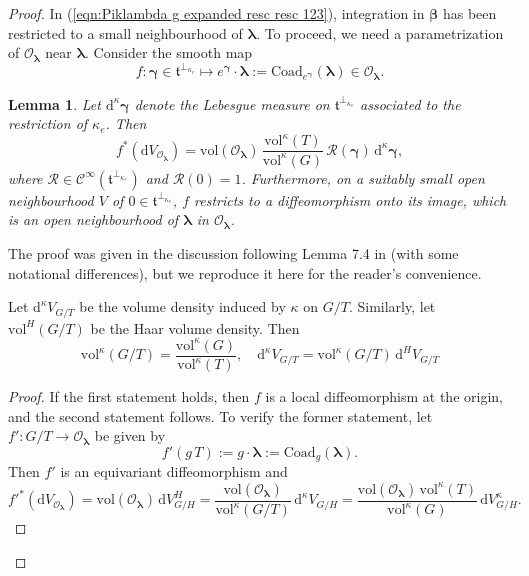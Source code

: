 \documentclass[12pt,a4paper]{article}
\theoremstyle{plain}
\newtheorem{lem}[thm]{Lemma}%
\theoremstyle{definition}
\begin{document}
\begin{proof}
In (\ref{eqn:Piklambda g expanded resc resc 123}), 
integration in $\boldsymbol{\beta}$ has been restricted to a small
neighbourhood of $\boldsymbol{\lambda}$. To proceed, we need a
parametrization of $\mathcal{O}_{\boldsymbol{\lambda}}$
near $\boldsymbol{\lambda}$. Consider the smooth map
\begin{equation}
\label{eqn:defn di f gamma lambda}
f:\boldsymbol{\gamma}\in \mathfrak{t}^{\perp_{\kappa_e}}\mapsto
e^{\boldsymbol{\gamma}}\cdot \boldsymbol{\lambda}:=
\mathrm{Coad}_{e^{\boldsymbol{\gamma}}}(\boldsymbol{\lambda})\in 
\mathcal{O}_{\boldsymbol{\lambda}}.
\end{equation}
%


\begin{lem}
Let $\mathrm{d}^{\kappa}\boldsymbol{\gamma}$ denote the Lebesgue measure
on $\mathfrak{t}^{\perp_{\kappa_e}}$ associated 
to the restriction of $\kappa_e$.
Then
$$
f^*(\mathrm{d}V_{\mathcal{O}_{\boldsymbol{\lambda}}})=
\mathrm{vol}(\mathcal{O}_{\boldsymbol{\lambda}})\,\frac{\mathrm{vol}^\kappa(T)}{\mathrm{vol}^\kappa(G)}\,
\mathcal{R} (\boldsymbol{\gamma})\,\mathrm{d}^\kappa\boldsymbol{\gamma},
$$
where $\mathcal{R}
\in \mathcal{C}^\infty(\mathfrak{t}^{\perp_{\kappa_e}})$
and $\mathcal{R}(0)=1$. Furthermore, on a suitably small open neighbourhood $V$ of $0\in 
\mathfrak{t}^{\perp_{\kappa_e}}$, $f$ restricts to a diffeomorphism
onto its image, which is an open neighbourhood of $\boldsymbol{\lambda}$
in $\mathcal{O}_{\boldsymbol{\lambda}}$.
\end{lem}

The proof was given in the discussion following Lemma 7.4 in 
\cite{p22} (with some notational differences), 
but we reproduce it here for the reader's convenience. 

Let $\mathrm{d}^\kappa V_{G/T}$ be the volume density induced by
$\kappa$ on $G/T$. Similarly, let $\mathrm{vol}^H(G/T)$ be the Haar volume density.
Then
$$
\mathrm{vol}^\kappa (G/T)=
\frac{\mathrm{vol}^\kappa (G)}{\mathrm{vol}^\kappa (T)},\quad 
\mathrm{d}^\kappa V_{G/T}=\mathrm{vol}^\kappa (G/T)\,
\mathrm{d}^H V_{G/T}
$$


\begin{proof}
If the first statement holds, then $f$ is a local diffeomorphism at
the origin, and the second statement follows.
To verify the former statement, 
let $f':G/T\rightarrow \mathcal{O}_{\boldsymbol{\lambda}}$ be given by
$$
f'(g\,T):=g\cdot \boldsymbol{\lambda}:=
\mathrm{Coad}_g(\boldsymbol{\lambda}).
$$
Then $f'$ is an equivariant diffeomorphism and 
$$
{f'}^*(\mathrm{d}V_{\mathcal{O}_{\boldsymbol{\lambda}}})=
\mathrm{vol}(\mathcal{O}_{\boldsymbol{\lambda}})\,
\mathrm{d}V^H_{G/H}=
\frac{\mathrm{vol}(\mathcal{O}_{\boldsymbol{\lambda}})}{\mathrm{vol}^\kappa
(G/T)}\,
\mathrm{d}^\kappa V _{G/H}=
\frac{\mathrm{vol}(\mathcal{O}_{\boldsymbol{\lambda}})\,\mathrm{vol}^\kappa
(T)}{\mathrm{vol}^\kappa
(G)}\,
\mathrm{d}V^\kappa _{G/H}.
$$


\end{proof}
\end{proof}
\end{document}
